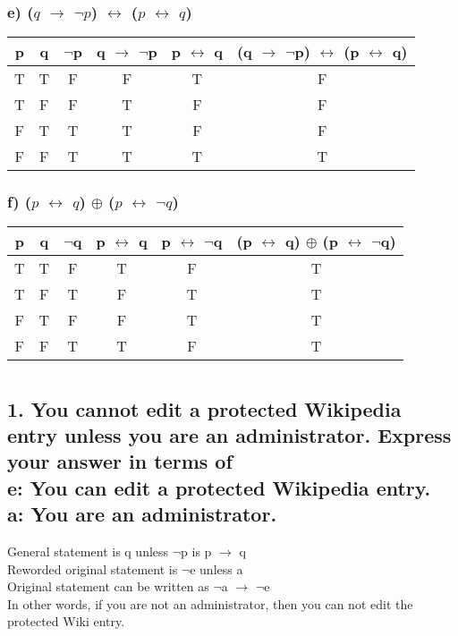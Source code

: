 \documentclass[11pt, oneside]{article} %
\numberwithin{equation}{section} %
\numberwithin{figure}{section} %
\numberwithin{table}{section} %
\begin{document}
\begin{table}[!htbp]
\subsubsection{e) ($q$ $\rightarrow$ $\neg$$p$) $\leftrightarrow$ ($p$ $\leftrightarrow$ $q$)}
\begin{tabular}{c c c c c c}
\hline\hline
p & q & $\neg$p & q $\rightarrow$ $\neg$p & p $\leftrightarrow$ q & (q $\rightarrow$ $\neg$p) $\leftrightarrow$ (p $\leftrightarrow$ q) \\ [0.5ex] 
\hline
T & T & F & F & T & F\\
T & F & F & T & F & F\\
F & T & T & T & F & F\\
F & F & T & T & T & T \\ [1ex]
\hline
\end{tabular}
\label{table:nonlin}
\end{table}

\begin{table}[!htbp]
\subsubsection{f) ($p$ $\leftrightarrow$ $q$) $\oplus$ ($p$ $\leftrightarrow$ $\neg$$q$)}
\begin{tabular}{c c c c c c}
\hline\hline
p & q & $\neg$q & p $\leftrightarrow$ q & p $\leftrightarrow$ $\neg$q & (p $\leftrightarrow$ q) $\oplus$ (p $\leftrightarrow$ $\neg$q) \\ [0.5ex] 
\hline
T & T & F & T & F & T\\
T & F & T & F & T & T\\
F & T & F  & F & T & T\\
F & F & T & T & F & T\\ [1ex]
\hline
\end{tabular}
\label{table:nonlin}
\end{table}

\section{}
\subsection{1. You cannot edit a protected Wikipedia entry unless you are an administrator. Express your answer in terms of \\
e: You can edit a protected Wikipedia entry.\\
a: You are an administrator.}
General statement is q unless $\neg$p is p $\rightarrow$ q \\
Reworded original statement is $\neg$e unless a \\
Original statement can be written as $\neg$a  $\rightarrow$ $\neg$e \\
In other words, if you are not an administrator, then you can not edit the protected Wiki entry.
\end{document}
